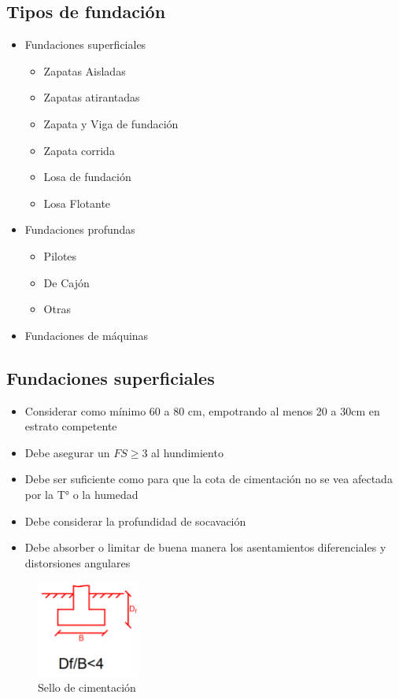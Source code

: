 \subsection{Tipos de fundación}
\begin{itemize}
    \item Fundaciones superficiales
    \begin{itemize}
        \item Zapatas Aisladas
        \item Zapatas atirantadas
        \item Zapata y Viga de fundación
        \item Zapata corrida
        \item Losa de fundación
        \item Losa Flotante
    \end{itemize}
    \item Fundaciones profundas
    \begin{itemize}
        \item Pilotes
        \item De Cajón
        \item Otras
    \end{itemize}
    \item Fundaciones de máquinas
\end{itemize}

\subsection{Fundaciones superficiales}
\begin{itemize}
    \item Considerar como mínimo 60 a 80 cm, empotrando al menos 20 a 30cm en estrato competente
    \item Debe asegurar un $FS \geq 3$ al hundimiento
    \item Debe ser suficiente como para que la cota de cimentación no se vea afectada por la T° o la humedad
    \item Debe considerar la profundidad de socavación
    \item Debe absorber o limitar de buena manera los asentamientos diferenciales y distorsiones angulares
\end{itemize}
\begin{figure}[h]
    \centering
    \includegraphics[width=0.3\textwidth]{FOTOS/sello_cimentacion.png}
    \caption{Sello de cimentación}
    \label{fig:9_1}    
\end{figure}


